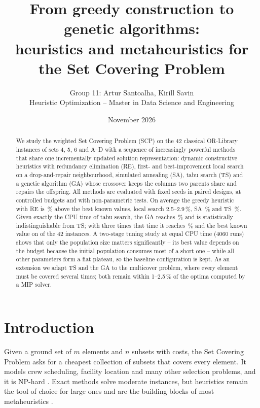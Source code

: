 \documentclass[11pt,a4paper]{article}
\title{From greedy construction to genetic algorithms:\\ heuristics and metaheuristics for the Set Covering Problem}
\author{Group 11: Artur Santoalha, Kirill Savin\\[2pt] \small Heuristic Optimization -- Master in Data Science and Engineering}
\date{November 2026}
\begin{document}
\maketitle

\begin{abstract}
We study the weighted Set Covering Problem (SCP) on the 42 classical OR-Library instances of sets 4, 5, 6 and A--D with a sequence of increasingly powerful methods that share one incrementally updated solution representation:
dynamic constructive heuristics with redundancy elimination (RE), first- and best-improvement local search on a drop-and-repair neighbourhood, simulated annealing (SA), tabu search (TS) and a genetic algorithm (GA) whose crossover keeps the columns two parents share and repairs the offspring.
All methods are evaluated with fixed seeds in paired designs, at controlled budgets and with non-parametric tests.
On average the greedy heuristic with RE is \devCHthreeRE\,\% above the best known values, local search 2.5--2.9\,\%, SA \devSA\,\% and TS \devTS\,\%.
Given exactly the CPU time of tabu search, the GA reaches \devGAshort\,\% and is statistically indistinguishable from TS; with three times that time it reaches \devGAlong\,\% and the best known value on \hitGAlong{} of the 42 instances.
A two-stage tuning study at equal CPU time (4060 runs) shows that only the population size matters significantly -- its best value depends on the budget because the initial population consumes most of a short one -- while all other parameters form a flat plateau, so the baseline configuration is kept.
As an extension we adapt TS and the GA to the multicover problem, where every element must be covered several times; both remain within 1--2.5\,\% of the optima computed by a MIP solver.
\end{abstract}

\section{Introduction}
Given a ground set of $m$ elements and $n$ subsets with costs, the Set Covering Problem asks for a cheapest collection of subsets that covers every element.
It models crew scheduling, facility location and many other selection problems, and it is NP-hard \cite{garey1979}.
Exact methods solve moderate instances, but heuristics remain the tool of choice for large ones and are the building blocks of most metaheuristics \cite{caprara2000}.
\end{document}
